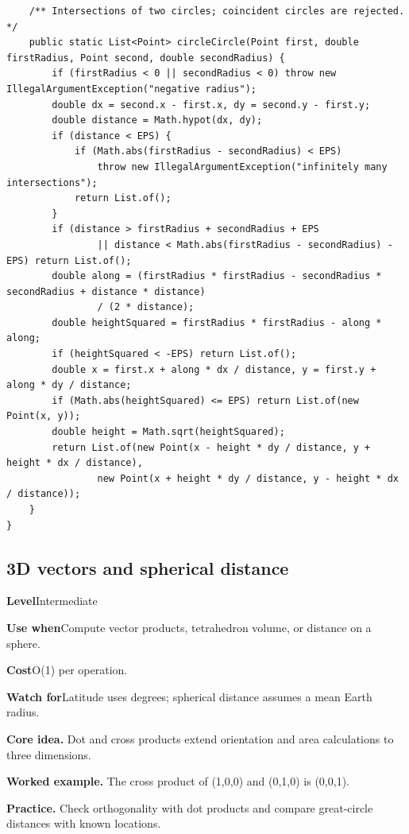 \documentclass[10pt,letterpaper]{article}
\newcommand{\entrylabel}[1]{\textcolor{accent}{\bfseries #1}}
\begin{document}
\begin{lstlisting}
    /** Intersections of two circles; coincident circles are rejected. */
    public static List<Point> circleCircle(Point first, double firstRadius, Point second, double secondRadius) {
        if (firstRadius < 0 || secondRadius < 0) throw new IllegalArgumentException("negative radius");
        double dx = second.x - first.x, dy = second.y - first.y;
        double distance = Math.hypot(dx, dy);
        if (distance < EPS) {
            if (Math.abs(firstRadius - secondRadius) < EPS)
                throw new IllegalArgumentException("infinitely many intersections");
            return List.of();
        }
        if (distance > firstRadius + secondRadius + EPS
                || distance < Math.abs(firstRadius - secondRadius) - EPS) return List.of();
        double along = (firstRadius * firstRadius - secondRadius * secondRadius + distance * distance)
                / (2 * distance);
        double heightSquared = firstRadius * firstRadius - along * along;
        if (heightSquared < -EPS) return List.of();
        double x = first.x + along * dx / distance, y = first.y + along * dy / distance;
        if (Math.abs(heightSquared) <= EPS) return List.of(new Point(x, y));
        double height = Math.sqrt(heightSquared);
        return List.of(new Point(x - height * dy / distance, y + height * dx / distance),
                new Point(x + height * dy / distance, y - height * dx / distance));
    }
}
\end{lstlisting}
\subsection{3D vectors and spherical distance}
\begin{guidebox}\small
\entrylabel{Level}\quad Intermediate\par
\entrylabel{Use when}\quad Compute vector products, tetrahedron volume, or distance on a sphere.\par
\entrylabel{Cost}\quad O(1) per operation.\par
\entrylabel{Watch for}\quad Latitude uses degrees; spherical distance assumes a mean Earth radius.\par
\end{guidebox}
\noindent\textbf{Core idea.} Dot and cross products extend orientation and area calculations to three dimensions.\par
\noindent\textbf{Worked example.} The cross product of (1,0,0) and (0,1,0) is (0,0,1).\par
\noindent\textbf{Practice.} Check orthogonality with dot products and compare great-circle distances with known locations.\par
\end{document}
